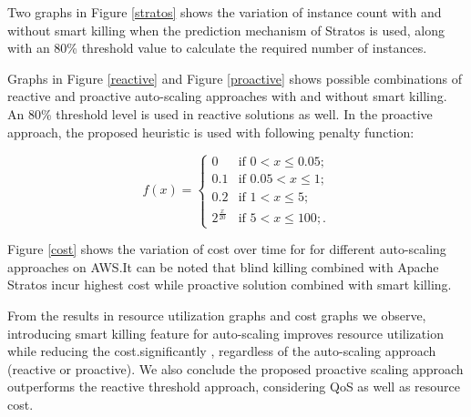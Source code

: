 Two graphs in Figure \ref{stratos} shows the variation of instance count with and without smart killing when the prediction mechanism of Stratos is used, along with an 80\% threshold value to calculate the required number of instances.

Graphs in Figure \ref{reactive} and Figure \ref{proactive} shows possible combinations of reactive and proactive auto-scaling approaches with and without smart killing. An 80\% threshold level is used in reactive solutions as well. In the proactive approach, the proposed heuristic is used with following penalty function:

$$f(x) = \begin{cases} 
0 & \text{if $0 < x \le 0.05$}; \\
0.1 & \text{if $0.05 < x \le 1$}; \\
0.2 & \text{if $1 < x \le 5$};\\
2^{\frac{x}{20}} & \text{if $5 < x \le 100$};.\end{cases} $$


Figure \ref{cost} shows the variation of cost over time for for different auto-scaling approaches on AWS.It can be noted that blind killing combined with Apache Stratos incur highest cost while proactive solution combined with smart killing.

From the results in resource utilization graphs and cost graphs we observe, introducing smart killing feature for auto-scaling improves resource utilization while reducing the cost.significantly , regardless of the auto-scaling approach (reactive or proactive). We also conclude the proposed proactive scaling approach outperforms the reactive threshold approach, considering QoS as well as resource cost.